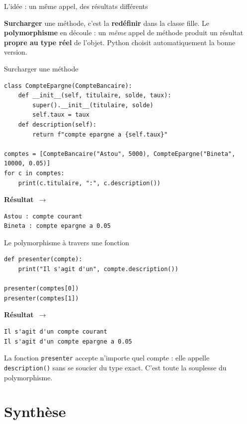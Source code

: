 \documentclass[aspectratio=169,11pt]{beamer}
\newcommand{\resultat}{{\scriptsize\textbf{R\'esultat}~$\rightarrow$}\par\vspace{1pt}}
\begin{document}
\begin{frame}{L'idée : un même appel, des résultats différents}
\begin{ucaddef}
{\small \textbf{Surcharger} une méthode, c'est la \textbf{redéfinir} dans la classe fille. Le \textbf{polymorphisme} en découle : un \emph{même} appel de méthode produit un résultat \textbf{propre au type réel} de l'objet. Python choisit automatiquement la bonne version.}
\end{ucaddef}
\end{frame}

\begin{frame}[fragile]{Surcharger une méthode}
\begin{lstlisting}
class CompteEpargne(CompteBancaire):
    def __init__(self, titulaire, solde, taux):
        super().__init__(titulaire, solde)
        self.taux = taux
    def description(self):
        return f"compte epargne a {self.taux}"

comptes = [CompteBancaire("Astou", 5000), CompteEpargne("Bineta", 10000, 0.05)]
for c in comptes:
    print(c.titulaire, ":", c.description())
\end{lstlisting}
\resultat
\begin{lstlisting}[style=out]
Astou : compte courant
Bineta : compte epargne a 0.05
\end{lstlisting}
\end{frame}

\begin{frame}[fragile]{Le polymorphisme à travers une fonction}
\begin{lstlisting}
def presenter(compte):
    print("Il s'agit d'un", compte.description())

presenter(comptes[0])
presenter(comptes[1])
\end{lstlisting}
\resultat
\begin{lstlisting}[style=out]
Il s'agit d'un compte courant
Il s'agit d'un compte epargne a 0.05
\end{lstlisting}
{\small La fonction \texttt{presenter} accepte n'importe quel compte : elle appelle \texttt{description()} sans se soucier du type exact. C'est toute la souplesse du polymorphisme.}
\end{frame}

\section{Synthèse}
\end{document}
